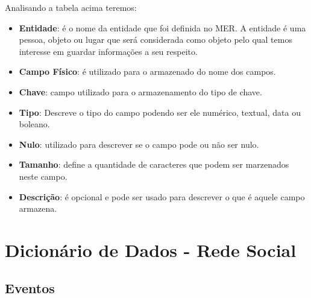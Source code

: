 \documentclass[12pt,a4paper]{article}
\begin{document}
Analisando a tabela acima teremos:

\begin{itemize}
\item \textbf{Entidade}: é o nome da entidade que foi definida no MER. A entidade é uma pessoa, objeto ou lugar que será considerada como objeto pelo qual temos interesse em guardar informações a seu respeito.

\item \textbf{Campo Físico}: é utilizado para o armazenado do nome dos campos.

\item \textbf{Chave}: campo utilizado para o armazenamento do tipo de chave.

\item \textbf{Tipo}: Descreve o tipo do campo podendo ser ele numérico, textual, data ou boleano.

\item \textbf{Nulo}: utilizado para descrever se o campo pode ou não ser nulo.

\item \textbf{Tamanho}: define a quantidade de caracteres que podem ser marzenados neste campo.

\item \textbf{Descrição}: é opcional e pode ser usado para descrever o que é aquele campo armazena.
\end{itemize}

\newpage
\section{Dicionário de Dados - Rede Social}
\subsection{Eventos}
\end{document}
